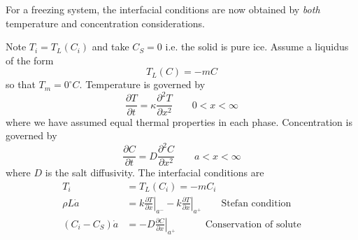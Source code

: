 \documentclass{jknotes}
\begin{document}
For a freezing system, the interfacial conditions are now obtained by
\emph{both} temperature and concentration considerations.

\begin{center}
\end{center}
Note $T_i = T_L(C_i)$ and take $C_S = 0$ i.e. the solid is pure ice. Assume a
liquidus of the form
\begin{equation}
	T_L(C) = -mC
\end{equation}
so that $T_m = 0^{\circ}C$.  Temperature is governed by
\begin{equation}
	\frac{\partial T}{\partial t} = \kappa \frac{\partial^2 T}{\partial x^2}
	\hspace{2em} 0 < x < \infty
\end{equation}
where we have assumed equal thermal properties in each phase. Concentration is
governed by
\begin{equation}
	\frac{\partial C}{\partial t} = D \frac{\partial^2 C}{\partial x^2}
	\hspace{2em} a < x < \infty
\end{equation}
where $D$ is the salt diffusivity. The interfacial conditions are
\begin{align}
	T_i &= T_L(C_i) = -mC_i\\
	\rho L \dot{a} &= k\left.\frac{\partial T}{\partial x}\right|_{a^-} - k
	\left.\frac{\partial T}{\partial x}\right|_{a^+} \hspace{2em} \text{Stefan
	condition}\\
	(C_i-C_S)\dot{a} &= -D \left.\frac{\partial C}{\partial x}\right|_{a^+}
	\hspace{3em} \text{Conservation of solute}
\end{align}
\end{document}
